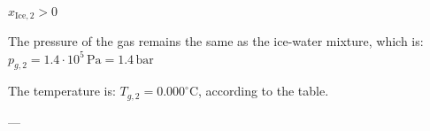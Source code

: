 \( x_{\text{Ice},2} > 0 \)  

The pressure of the gas remains the same as the ice-water mixture, which is:  
\( p_{g,2} = 1.4 \cdot 10^5 \, \text{Pa} = 1.4 \, \text{bar} \)  

The temperature is:  
\( T_{g,2} = 0.000^\circ \text{C} \), according to the table.  

---